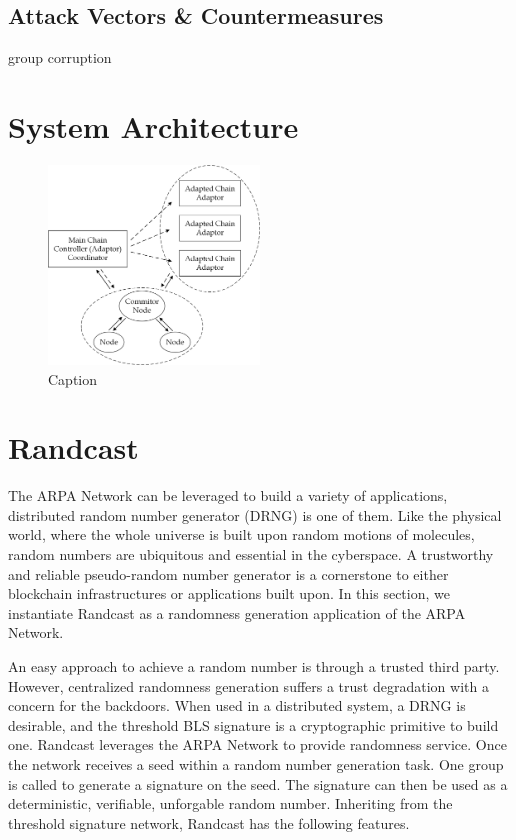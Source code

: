 \documentclass[11pt]{article}
\begin{document}
\subsection{Attack Vectors \& Countermeasures}

group corruption


\section{System Architecture}

\begin{figure}
    \centering
    \includegraphics[width=0.5\textwidth]{figures/arpa network high level architecture.png}
    \caption{Caption}
    \label{fig:my_label}
\end{figure}

\section{Randcast}

The ARPA Network can be leveraged to build a variety of applications, distributed random number generator (DRNG) is one of them. Like the physical world, where the whole universe is built upon random motions of molecules, random numbers are ubiquitous and essential in the cyberspace. A trustworthy and reliable pseudo-random number generator is a cornerstone to either blockchain infrastructures or applications built upon. In this section, we instantiate Randcast as a randomness generation application of the ARPA Network.

An easy approach to achieve a random number is through a trusted third party. However, centralized randomness generation suffers a trust degradation with a concern for the backdoors. When used in a distributed system, a DRNG is desirable, and the threshold BLS signature is a cryptographic primitive to build one. Randcast leverages the ARPA Network to provide randomness service. Once the network receives a seed within a random number generation task. One group is called to generate a signature on the seed. The signature can then be used as a deterministic, verifiable, unforgable random number. Inheriting from the threshold signature network, Randcast has the following features.
\end{document}
